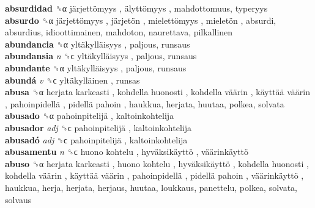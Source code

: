 \textbf{absurdidad} ␝α   järjettömyys ,  älyttömyys , mahdottomuus, typeryys  \\
\textbf{absurdo} ␝α   järjettömyys ,  järjetön ,  mielettömyys ,  mieletön , absurdi, absurdius, idioottimainen, mahdoton, naurettava, pilkallinen  \\
\textbf{abundancia} ␝α   yltäkylläisyys , paljous, runsaus  \\
\textbf{abundansia} \emph{n}  ␝ϲ   yltäkylläisyys , paljous, runsaus  \\
\textbf{abundante} ␝α   yltäkylläisyys , paljous, runsaus  \\
\textbf{abundá} \emph{v}  ␝ϲ   yltäkylläinen , runsas  \\
\textbf{abusa} ␝α   herjata karkeasti ,  kohdella huonosti ,  kohdella väärin ,  käyttää väärin ,  pahoinpidellä ,  pidellä pahoin , haukkua, herjata, huutaa, polkea, solvata  \\
\textbf{abusado} ␝α   pahoinpitelijä , kaltoinkohtelija  \\
\textbf{abusador} \emph{adj}  ␝ϲ   pahoinpitelijä , kaltoinkohtelija  \\
\textbf{abusadó} \emph{adj}  ␝ϲ   pahoinpitelijä , kaltoinkohtelija  \\
\textbf{abusamentu} \emph{n}  ␝ϲ   huono kohtelu ,  hyväksikäyttö ,  väärinkäyttö   \\
\textbf{abuso} ␝α   herjata karkeasti ,  huono kohtelu ,  hyväksikäyttö ,  kohdella huonosti ,  kohdella väärin ,  käyttää väärin ,  pahoinpidellä ,  pidellä pahoin ,  väärinkäyttö , haukkua, herja, herjata, herjaus, huutaa, loukkaus, panettelu, polkea, solvata, solvaus  \\
